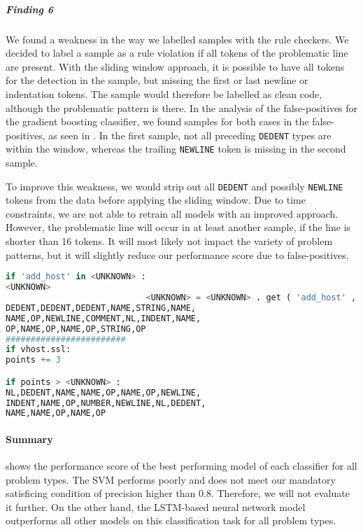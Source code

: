 \subparagraph{Finding 6}
We found a weakness in the way we labelled samples with the rule checkers. We decided to label a sample as a rule violation if all tokens of the problematic line are present. With the sliding window approach, it is possible to have all tokens for the detection in the sample, but missing the first or last newline or indentation tokens. The sample would therefore be labelled as clean code, although the problematic pattern is there. In the analysis of the false-positives for the gradient boosting classifier, we found samples for both cases in the false-positives, as seen in . In the first sample, not all preceding \texttt{DEDENT} types are within the window, whereas the trailing \texttt{NEWLINE} token is missing in the second sample.

To improve this weakness, we would strip out all \texttt{DEDENT} and possibly \texttt{NEWLINE} tokens from the data before applying the sliding window. Due to time constraints, we are not able to retrain all models with an improved approach. However, the problematic line will occur in at least another sample, if the line is shorter than 16 tokens. It will most likely not impact the variety of problem patterns, but it will slightly reduce our performance score due to false-positives.


\begin{lstlisting}[float,floatplacement=H, language=Python, label=lst:weaknes_end_start_sliding_window, caption={False-positives of the best gradient boosting classifier with 300 boosting stages, a learning rate of 0.2, type encoding and without resampling for the CCS type. In the first sample, not all preceding \texttt{DEDENT} tokens are in this window. For the second example, the trailing \texttt{NEWLINE} token is missing in the window. Without this encoding issue, both samples would have been detected correctly.}]
if 'add_host' in <UNKNOWN> : 
<UNKNOWN> 
                            <UNKNOWN> = <UNKNOWN> . get ( 'add_host' ,
DEDENT,DEDENT,DEDENT,NAME,STRING,NAME,
NAME,OP,NEWLINE,COMMENT,NL,INDENT,NAME,
OP,NAME,OP,NAME,OP,STRING,OP
########################
if vhost.ssl: 
points += 3 

if points > <UNKNOWN> :
NL,DEDENT,NAME,NAME,OP,NAME,OP,NEWLINE,
INDENT,NAME,OP,NUMBER,NEWLINE,NL,DEDENT,
NAME,NAME,OP,NAME,OP
\end{lstlisting}


\paragraph{Summary}

  shows the performance score of the best performing model of each classifier for all problem types.
 The SVM performs poorly and does not meet our mandatory satisficing condition of precision higher than 0.8. Therefore, we will not evaluate it further. On the other hand, the LSTM-based neural network model outperforms all other models on this classification task for all problem types.

